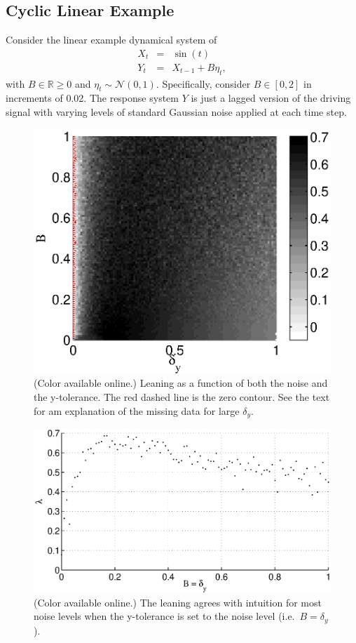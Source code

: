 \documentclass[a4paper,11pt,twocolumn]{article}
\begin{document}
\subsection{Cyclic Linear Example}
Consider the linear example dynamical system of
\begin{eqnarray}
\label{eq:linearex}
X_t &=& \sin(t)\\
Y_t &=& X_{t-1}+B\eta_t,
\end{eqnarray}
with $B\in\mathbb{R}\ge 0$ and $\eta_t\sim\mathcal{N}\left(0,1\right)$.  Specifically, consider $B\in[0,2]$ in increments of 0.02.  The response system $Y$ is just a lagged version of the driving signal with varying levels of standard Gaussian noise applied at each time step.  
\begin{figure}[ht]
\includegraphics[scale=0.65]{SimpleCyclicexample_Bdy.eps}
\caption{(Color available online.) Leaning as a function of both the noise and the y-tolerance.  The red dashed line is the zero contour.  See the text for am explanation of the missing data for large $\delta_y$.}
\end{figure}
\begin{figure}[ht]
\includegraphics[scale=0.45]{SimpleCyclicexample_Bxytol.eps}
\caption{(Color available online.) The leaning agrees with intuition for most noise levels when the y-tolerance is set to the noise level (i.e.\ $B=\delta_y$).}
\end{figure}
\end{document}
